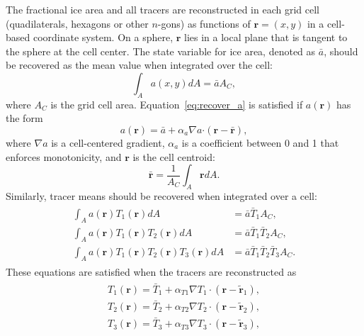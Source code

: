 The fractional ice area and all tracers are reconstructed in each grid cell (quadilaterals, hexagons or other $n$-gons) as functions of $\mathbf{r} = (x,y)$ in a cell-based coordinate system. On a sphere, $\mathbf{r}$ lies in a local plane that is tangent to the sphere at the cell center. The state variable for ice area, denoted as $\bar{a}$, should be recovered as the mean value when integrated over the cell:
\begin{equation}
\label{eq:recover_a}
\int_{A}{a(x,y)dA=\bar{a}{{A}_{C}}},
\end{equation}
where $A_C$ is the grid cell area. Equation~\ref{eq:recover_a} is satisfied if $a(\mathbf{r})$ has the form
\begin{equation}
\label{eq:reconstruct_a}
a(\mathbf{r})=\bar{a}+{{\alpha }_{a}}\nabla a \boldsymbol{\cdot} (\mathbf{r}-\mathbf{\bar{r}}),
\end{equation}
where $\nabla a$ is a cell-centered gradient, ${\alpha }_{a}$ is a coefficient between 0 and 1 that enforces monotonicity, and $\mathbf{r}$ is the cell centroid:
\begin{equation}
\label{eq:centroid}
\mathbf{\bar{r}}=\frac{1}{{{A}_{C}}}\int_{A}{\mathbf{r} dA}.
\end{equation}
Similarly, tracer means should be recovered when integrated over a cell:
\begin{align}
\begin{split} %
\label{eq:recover_T}
   \int_{A}{a(\mathbf{r}){{T}_{1}}}(\mathbf{r})dA & = \bar{a}{{{\bar{T}}}_{1}}{{A}_{C}},  \\
   \int_{A}{a(\mathbf{r}){{T}_{1}}}(\mathbf{r}){{T}_{2}}(\mathbf{r})dA & =\bar{a}{{{\bar{T}}}_{1}}{{{\bar{T}}}_{2}}{{A}_{C}},  \\
   \int_{A}{a(\mathbf{r}){{T}_{1}}}(\mathbf{r}){{T}_{2}}(\mathbf{r}){{T}_{3}}(\mathbf{r})dA & = \bar{a}{{{\bar{T}}}_{1}}{{{\bar{T}}}_{2}}{{{\bar{T}}}_{3}}{{A}_{C}}.
\end{split}
\end{align}
These equations are satisfied when the tracers are reconstructed as
\begin{align}
\begin{split}
\label{eq:reconstruct_T}
   {{T}_{1}}(\mathbf{r}) = {{{\bar{T}}}_{1}}+{{\alpha }_{T1}}\nabla {{T}_{1}}\cdot (\mathbf{r}-{{{\mathbf{\tilde{r}}}}_{1}}),  \\
   {{T}_{2}}(\mathbf{r}) = {{{\bar{T}}}_{2}}+{{\alpha }_{T2}}\nabla {{T}_{2}}\cdot (\mathbf{r}-{{{\mathbf{\tilde{r}}}}_{2}}),  \\
   {{T}_{3}}(\mathbf{r}) = {{{\bar{T}}}_{3}}+{{\alpha }_{T3}}\nabla {{T}_{3}}\cdot (\mathbf{r}-{{{\mathbf{\tilde{r}}}}_{3}}),
\end{split}
\end{align}

